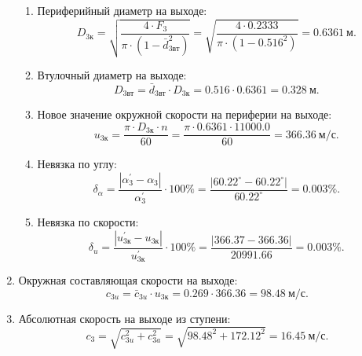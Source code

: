 \documentclass[a4paper,12pt]{article}
\begin{document}
\begin{enumerate}
\begin{enumerate}
            \item Периферийный диаметр на выходе:
            \[
                D_{3к} = \sqrt{ \frac{ 4 \cdot F_3 }{ \pi \cdot (1 - \bar{d}_{3вт}^2) } } = 
                \sqrt{ \frac{ 
                        4 \cdot 0.2333 
                    }{ 
                        \pi \cdot (1 - 0.516^2) 
                } } = 
                0.6361\ м.
            \]

            \item Втулочный диаметр на выходе:
            \[
                D_{3вт} = \bar{d}_{3вт} \cdot D_{3к} = 
                0.516 \cdot 0.6361 = 
                0.328\ м.
            \]

            \item Новое значение окружной скорости на периферии на выходе:
            \[
                u_{3к} = \frac{\pi \cdot D_{3к} \cdot n }{ 60 } = 
                \frac{\pi \cdot 0.6361 \cdot 11000.0 }{ 60 } = 
                366.36\ м/с.
            \]

            \item Невязка по углу:
            \[
                \delta_{\alpha} = \frac{ \left| \alpha_3^\prime - \alpha_3 \right| }{ \alpha_3^\prime } \cdot 100 \% = 
                \frac{ 
                    \left| 60.22^\circ - 60.22^\circ \right| 
                }{ 
                    60.22^\circ
                } = 
                0.003 \%.
            \]

            \item Невязка по скорости:
            \[
                \delta_{u} = \frac{ \left| u_{3к}^\prime - u_{3к} \right| }{ u_{3к}^\prime } \cdot 100 \% = 
                \frac{ 
                    \left| 366.37 - 366.36 \right| 
                }{ 
                    20991.66                
                } = 
                0.003 \%.
            \]

        \end{enumerate}

        \item Окружная составляющая скорости на выходе:
        \[
            c_{3u} = \bar{c}_{3u} \cdot u_{3к} = 
            0.269 \cdot 366.36 = 
            98.48\ м/с.
        \]

        \item Абсолютная скорость на выходе из ступени:
        \[
            c_3 = \sqrt{ c_{3u}^2 + c_{3a}^2 } = 
            \sqrt{ 98.48^2 + 172.12^2 } =
            16.45\ м/с. 
        \] 


\end{enumerate}
\end{document}

